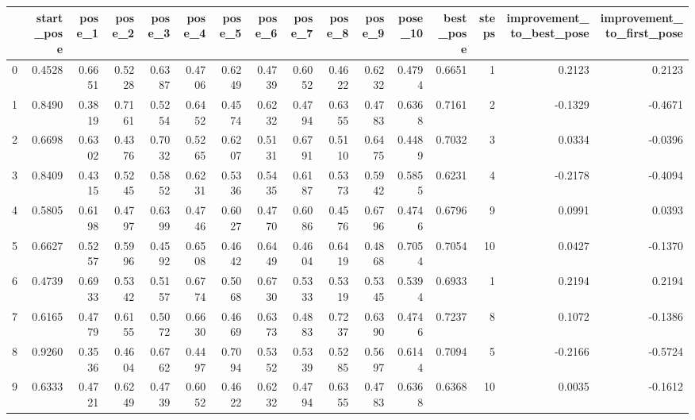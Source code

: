 \begin{tabular}{lrrrrrrrrrrrrrrr}
\toprule
{} &  start\_pose &  pose\_1 &  pose\_2 &  pose\_3 &  pose\_4 &  pose\_5 &  pose\_6 &  pose\_7 &  pose\_8 &  pose\_9 &  pose\_10 &  best\_pose &  steps &  improvement\_to\_best\_pose &  improvement\_to\_first\_pose \\
\midrule
0   &      0.4528 &  0.6651 &  0.5228 &  0.6387 &  0.4706 &  0.6249 &  0.4739 &  0.6052 &  0.4622 &  0.6232 &   0.4794 &     0.6651 &      1 &                    0.2123 &                     0.2123 \\
1   &      0.8490 &  0.3819 &  0.7161 &  0.5254 &  0.6452 &  0.4574 &  0.6232 &  0.4794 &  0.6355 &  0.4783 &   0.6368 &     0.7161 &      2 &                   -0.1329 &                    -0.4671 \\
2   &      0.6698 &  0.6302 &  0.4376 &  0.7032 &  0.5265 &  0.6207 &  0.5131 &  0.6791 &  0.5110 &  0.6475 &   0.4489 &     0.7032 &      3 &                    0.0334 &                    -0.0396 \\
3   &      0.8409 &  0.4315 &  0.5245 &  0.5852 &  0.6231 &  0.5336 &  0.5435 &  0.6187 &  0.5373 &  0.5942 &   0.5855 &     0.6231 &      4 &                   -0.2178 &                    -0.4094 \\
4   &      0.5805 &  0.6198 &  0.4797 &  0.6399 &  0.4746 &  0.6027 &  0.4770 &  0.6086 &  0.4576 &  0.6796 &   0.4746 &     0.6796 &      9 &                    0.0991 &                     0.0393 \\
5   &      0.6627 &  0.5257 &  0.5996 &  0.4592 &  0.6508 &  0.4642 &  0.6449 &  0.4604 &  0.6419 &  0.4868 &   0.7054 &     0.7054 &     10 &                    0.0427 &                    -0.1370 \\
6   &      0.4739 &  0.6933 &  0.5342 &  0.5157 &  0.6774 &  0.5068 &  0.6730 &  0.5333 &  0.5319 &  0.5345 &   0.5394 &     0.6933 &      1 &                    0.2194 &                     0.2194 \\
7   &      0.6165 &  0.4779 &  0.6155 &  0.5072 &  0.6630 &  0.4669 &  0.6373 &  0.4883 &  0.7237 &  0.6390 &   0.4746 &     0.7237 &      8 &                    0.1072 &                    -0.1386 \\
8   &      0.9260 &  0.3536 &  0.4604 &  0.6762 &  0.4497 &  0.7094 &  0.5352 &  0.5339 &  0.5285 &  0.5697 &   0.6144 &     0.7094 &      5 &                   -0.2166 &                    -0.5724 \\
9   &      0.6333 &  0.4721 &  0.6249 &  0.4739 &  0.6052 &  0.4622 &  0.6232 &  0.4794 &  0.6355 &  0.4783 &   0.6368 &     0.6368 &     10 &                    0.0035 &                    -0.1612 \\

\end{tabular}
